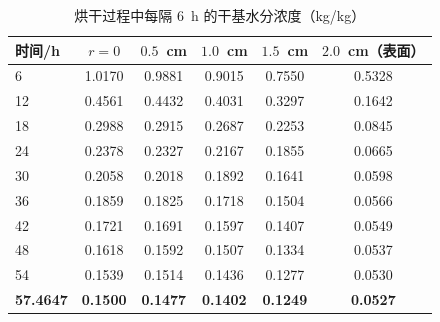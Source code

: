 \begin{table}[H]
  \centering
  \caption{烘干过程中每隔 $6$~h 的干基水分浓度（kg/kg）}
  \label{tab:table5_q3}
  \small
  \begin{tabular}{lccccc}
    \toprule
    时间/h & $r=0$ & $0.5$~cm & $1.0$~cm & $1.5$~cm & $2.0$~cm（表面） \\
    \midrule
    6 & 1.0170 & 0.9881 & 0.9015 & 0.7550 & 0.5328 \\
    12 & 0.4561 & 0.4432 & 0.4031 & 0.3297 & 0.1642 \\
    18 & 0.2988 & 0.2915 & 0.2687 & 0.2253 & 0.0845 \\
    24 & 0.2378 & 0.2327 & 0.2167 & 0.1855 & 0.0665 \\
    30 & 0.2058 & 0.2018 & 0.1892 & 0.1641 & 0.0598 \\
    36 & 0.1859 & 0.1825 & 0.1718 & 0.1504 & 0.0566 \\
    42 & 0.1721 & 0.1691 & 0.1597 & 0.1407 & 0.0549 \\
    48 & 0.1618 & 0.1592 & 0.1507 & 0.1334 & 0.0537 \\
    54 & 0.1539 & 0.1514 & 0.1436 & 0.1277 & 0.0530 \\
    \textbf{57.4647} & \textbf{0.1500} & \textbf{0.1477} & \textbf{0.1402} & \textbf{0.1249} & \textbf{0.0527} \\
    \bottomrule
  \end{tabular}
\end{table}
